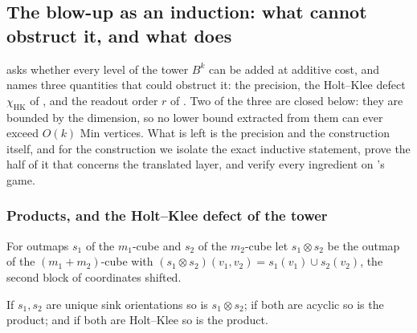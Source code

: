 
\subsection{The blow-up as an induction: what cannot obstruct it, and what does}
\label{lvl:sec}

 asks whether every level of the tower $B^{k}$ can be
added at additive cost, and names three quantities that could obstruct it: the
precision, the Holt--Klee defect $\chi_{\mathrm{HK}}$ of ,
and the readout order $r$ of .  Two of the three are
closed below: they are bounded by the dimension, so no lower bound extracted
from them can ever exceed $O(k)$ Min vertices.  What is left is the precision
and the construction itself, and for the construction we isolate the exact
inductive statement, prove the half of it that concerns the translated layer,
and verify every ingredient on 's game.

\subsubsection*{Products, and the Holt--Klee defect of the tower}

\begin{definition}\label{lvl:product}
For outmaps $s_1$ of the $m_1$-cube and $s_2$ of the $m_2$-cube let
$s_1\otimes s_2$ be the outmap of the $(m_1+m_2)$-cube with
$(s_1\otimes s_2)(v_1,v_2)=s_1(v_1)\cup s_2(v_2)$, the second block of
coordinates shifted.
\end{definition}

\begin{lemma}\label{lvl:hk-product}
If $s_1,s_2$ are unique sink orientations so is $s_1\otimes s_2$; if both are
acyclic so is the product; and if both are Holt--Klee so is the product.
\end{lemma}

